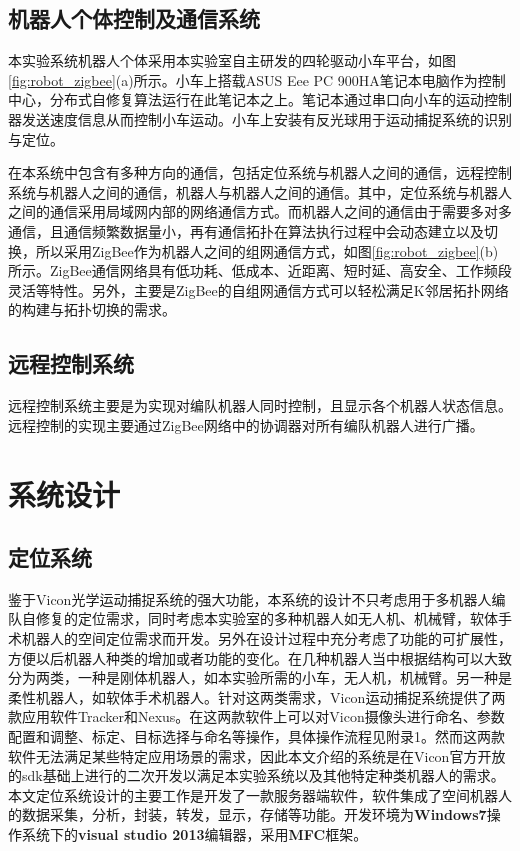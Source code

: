 \subsection{机器人个体控制及通信系统}
本实验系统机器人个体采用本实验室自主研发的四轮驱动小车平台，如图\ref{fig:robot_zigbee}(a)所示。小车上搭载ASUS Eee PC 900HA笔记本电脑作为控制中心，分布式自修复算法运行在此笔记本之上。笔记本通过串口向小车的运动控制器发送速度信息从而控制小车运动。小车上安装有反光球用于运动捕捉系统的识别与定位。
\begin{figure*}[!htbp]
	\centering
	\hspace{1cm}
\end{figure*}

在本系统中包含有多种方向的通信，包括定位系统与机器人之间的通信，远程控制系统与机器人之间的通信，机器人与机器人之间的通信。其中，定位系统与机器人之间的通信采用局域网内部的网络通信方式。而机器人之间的通信由于需要多对多通信，且通信频繁数据量小，再有通信拓扑在算法执行过程中会动态建立以及切换，所以采用ZigBee作为机器人之间的组网通信方式，如图\ref{fig:robot_zigbee}(b)所示。ZigBee通信网络具有低功耗、低成本、近距离、短时延、高安全、工作频段灵活等特性。另外，主要是ZigBee的自组网通信方式可以轻松满足K邻居拓扑网络的构建与拓扑切换的需求。

\subsection{远程控制系统}
远程控制系统主要是为实现对编队机器人同时控制，且显示各个机器人状态信息。远程控制的实现主要通过ZigBee网络中的协调器对所有编队机器人进行广播。

\section{系统设计}

\subsection{定位系统}
鉴于Vicon光学运动捕捉系统的强大功能，本系统的设计不只考虑用于多机器人编队自修复的定位需求，同时考虑本实验室的多种机器人如无人机、机械臂，软体手术机器人的空间定位需求而开发。另外在设计过程中充分考虑了功能的可扩展性，方便以后机器人种类的增加或者功能的变化。在几种机器人当中根据结构可以大致分为两类，一种是刚体机器人，如本实验所需的小车，无人机，机械臂。另一种是柔性机器人，如软体手术机器人。针对这两类需求，Vicon运动捕捉系统提供了两款应用软件Tracker和Nexus。在这两款软件上可以对Vicon摄像头进行命名、参数配置和调整、标定、目标选择与命名等操作，具体操作流程见附录1。然而这两款软件无法满足某些特定应用场景的需求，因此本文介绍的系统是在Vicon官方开放的sdk基础上进行的二次开发以满足本实验系统以及其他特定种类机器人的需求。本文定位系统设计的主要工作是开发了一款服务器端软件，软件集成了空间机器人的数据采集，分析，封装，转发，显示，存储等功能。开发环境为\textbf{Windows7}操作系统下的\textbf{visual studio 2013}编辑器，采用\textbf{MFC}框架。

